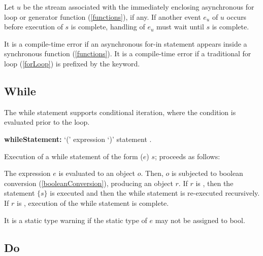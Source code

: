\documentclass{article}
\newcommand{\code}[1]{{\sf #1}}
\begin{document}
\LMHash{}
Let $u$ be the stream associated with the immediately enclosing asynchronous for loop or generator function (\ref{functions}), if any. If another event $e_u$ of $u$ occurs before execution of $s$ is complete, handling of $e_u$ must wait until $s$ is complete.


\LMHash{}
It is a compile-time error if an asynchronous for-in statement appears inside a synchronous function (\ref{functions}). It is a compile-time error if a traditional for loop  (\ref{forLoop}) is prefixed by the \AWAIT{}  keyword.



\subsection{While}

\LMHash{}
The while statement supports conditional iteration, where the condition is evaluated prior to the loop.

\begin{grammar}
{\bf whileStatement:}
      \WHILE{} `(' expression `)' statement  %
.
 \end{grammar}

\LMHash{}
 Execution of a while statement of the form \code{\WHILE{} ($e$) $s$;} proceeds as follows:

\LMHash{}
The expression $e$ is evaluated to an object $o$. Then, $o$ is  subjected to boolean conversion (\ref{booleanConversion}), producing an object $r$.  If $r$ is \TRUE{}, then the statement $\{s\}$ is executed and then the while statement is re-executed recursively. If $r$ is \FALSE{}, execution of the while statement is complete.

\LMHash{}
It is a static type warning if the static type of $e$ may not be assigned to \code{bool}.


\subsection{Do}
\end{document}
